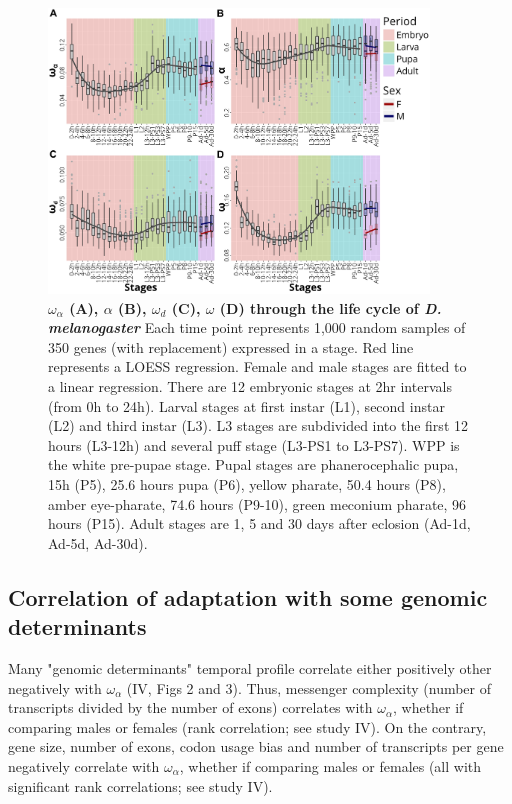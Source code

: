 \begin{figure}[t]
  \includegraphics[width=0.9\textwidth]{./Images/Art-IV/OmegaA_lifecycle.png}
  \centering
  \caption{\textbf{ {\large$\omega_{\alpha}$} (A),  {\large$\alpha$} (B), {\large$\omega_{d}$} (C), {\large$\omega$} (D) through the life cycle of \textit{D. melanogaster}} Each time point represents 1,000 random samples of 350 genes (with replacement) expressed in a stage. Red line represents a LOESS regression. Female and male stages are fitted to a linear regression. There are 12 embryonic stages at 2hr intervals (from 0h to 24h). Larval stages at first instar (L1), second instar (L2) and third instar (L3). L3 stages are subdivided into the first 12 hours (L3-12h) and several puff stage (L3-PS1 to L3-PS7). WPP is the white pre-pupae stage. Pupal stages are phanerocephalic pupa, 15h (P5), 25.6 hours pupa (P6), yellow pharate, 50.4 hours (P8), amber eye-pharate, 74.6 hours (P9-10), green meconium pharate, 96 hours (P15). Adult stages are 1, 5 and 30 days after eclosion (Ad-1d, Ad-5d, Ad-30d).
  }
  \label{fig:Art-IV-OmegaA_lifecycle}
\end{figure}

\subsection{Correlation of adaptation with some genomic determinants}
Many "genomic determinants" temporal profile correlate either positively other negatively with $\omega_{\alpha}$ (IV, Figs 2 and 3). 
%
Thus, messenger complexity (number of transcripts divided by the number of exons) correlates with $\omega_{\alpha}$, whether if comparing males or females (rank correlation; see study IV).
On the contrary, gene size, number of exons, codon usage bias and number of transcripts per gene negatively correlate with $\omega_{\alpha}$, whether if comparing males or females (all with significant rank correlations; see study IV). 

